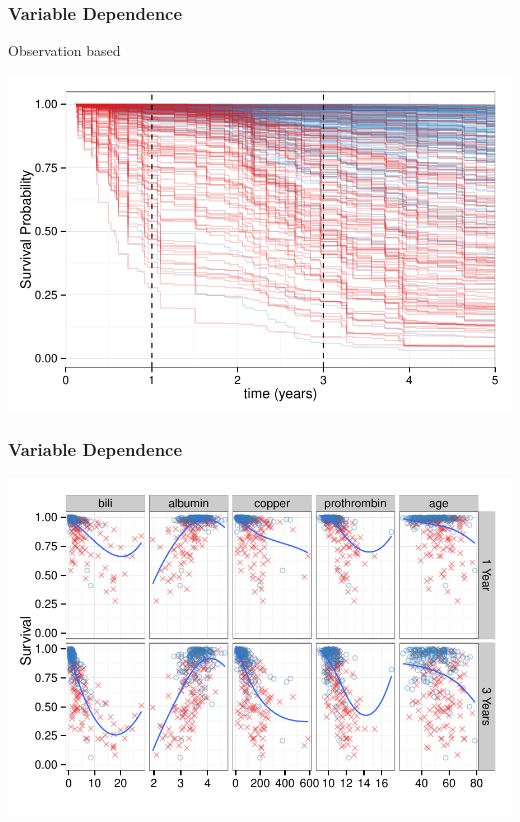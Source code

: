 \documentclass[xcolor=svgnames]{beamer}\usepackage[]{graphicx}\usepackage[]{color}
\newenvironment{knitrout}{}{} %
\begin{document}
\begin{frame}
\frametitle{Variable Dependence}

Observation based

\begin{knitrout}\footnotesize
{}\color{fgcolor}

{\centering \includegraphics[width=.9\linewidth]{figures/rfsrc-plot3Mnth-pbc-1} 

}



\end{knitrout}

\end{frame}
\begin{frame}
\frametitle{Variable Dependence}

\begin{knitrout}\footnotesize
{}\color{fgcolor}

{\centering \includegraphics[width=.9\linewidth]{figures/variable-plot-pbc-1} 

}



\end{knitrout}
\end{frame}
\end{document}
